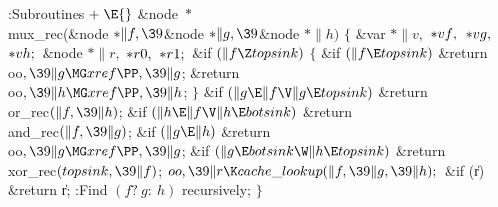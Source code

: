 \Y\B\4:Subroutines\X${}\mathrel+\E{}$\6
\&{node} ${}{*}{}$\\{mux\_rec}(\&{node} ${}{*}\|f,\39{}$\&{node} ${}{*}\|g,%
\39{}$\&{node} ${}{*}\|h){}$\1\1\2\2\6
${}\{{}$\1\6
\&{var} ${}{*}\|v,{}$ ${}{*}\\{vf},{}$ ${}{*}\\{vg},{}$ ${}{*}\\{vh};{}$\6
\&{node} ${}{*}\|r,{}$ ${}{*}\\{r0},{}$ ${}{*}\\{r1};{}$\7
\&{if} ${}(\|f\Z\\{topsink}){}$\5
${}\{{}$\1\6
\&{if} ${}(\|f\E\\{topsink}){}$\1\5
\&{return} \\{oo}${},\39\|g\MG\\{xref}\PP,\39\|g{}$;\2%
\6
\&{return} \\{oo}${},\39\|h\MG\\{xref}\PP,\39\|h{}$;\6
\4${}\}{}$\2\6
\&{if} ${}(\|g\E\|f\V\|g\E\\{topsink}){}$\1\5
\&{return} \\{or\_rec}${}(\|f,\39\|h){}$;\2\6
\&{if} ${}(\|h\E\|f\V\|h\E\\{botsink}){}$\1\5
\&{return} \\{and\_rec}${}(\|f,\39\|g){}$;\2\6
\&{if} ${}(\|g\E\|h){}$\1\5
\&{return} \\{oo}${},\39\|g\MG\\{xref}\PP,\39\|g{}$;\2%
\6
\&{if} ${}(\|g\E\\{botsink}\W\|h\E\\{topsink}){}$\1\5
\&{return} \\{xor\_rec}${}(\\{topsink},\39\|f){}$;\C{ $(f{?}\ 0{:}) = 1%
\oplus f$ }\2\6
${}\\{oo},\39\|r\K\\{cache\_lookup}(\|f,\39\|g,\39\|h);{}$\6
\&{if} (\|r)\1\5
\&{return} \|r;\2\6
:Find $(f{?}\ g{:}\ h)$ recursively\X;\6
\4${}\}{}$\2\par
\fi

